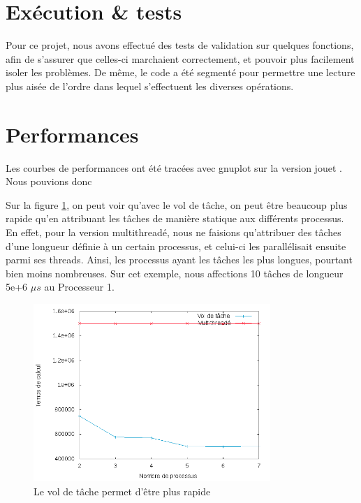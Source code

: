 \section{Exécution \& tests} %
\label{sec:execution}

Pour ce projet, nous avons effectué des tests de validation sur quelques fonctions, afin de s'assurer que celles-ci marchaient correctement, et pouvoir plus facilement isoler les problèmes. 
De même, le code a été segmenté pour permettre une lecture plus aisée de l'ordre dans lequel s'effectuent les diverses opérations.

\section{Performances} %
\label{sec:perf}

Les courbes de performances ont été tracées avec gnuplot sur la version \og jouet \fg. Nous pouvions donc


Sur la figure \ref{fig:sp}, on peut voir qu'avec le vol de tâche, on peut être beaucoup plus rapide qu'en attribuant les tâches de manière statique aux différents processus. En effet, pour la version multithreadé, nous ne faisions qu'attribuer des tâches d'une longueur définie à un certain processus, et celui-ci les parallélisait ensuite parmi ses threads. Ainsi, les processus ayant les tâches les plus longues, pourtant bien moins nombreuses. Sur cet exemple, nous affections 10 tâches de longueur 5e+6 $\mu s$ au Processeur 1.
\begin{figure}[H]
\centering
\includegraphics[width=0.8\textwidth]{stats.png}
\caption{Le vol de tâche permet d'être plus rapide}
\label{fig:sp}
\end{figure}

